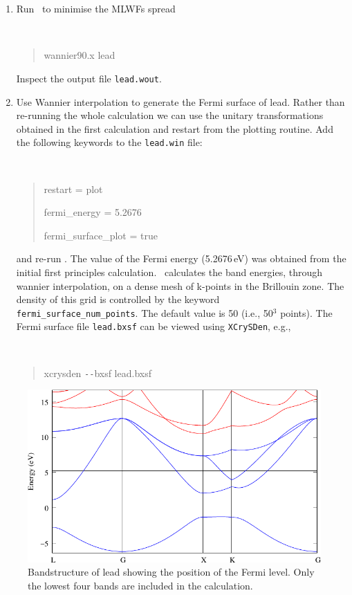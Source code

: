 \documentclass[a4paper,11pt,twoside]{article}
\begin{document}
\begin{enumerate}
\item Run \wannier\ to minimise the MLWFs spread
{\tt
\begin{quote}
wannier90.x lead
\end{quote} }
Inspect the output file {\tt lead.wout}.
\item Use Wannier interpolation to generate the Fermi surface of
  lead. Rather than re-running the whole calculation we can use the
  unitary transformations obtained in the first calculation and
  restart from the plotting routine. Add the following keywords to the
  {\tt lead.win} file: {\tt
\begin{quote}
restart = plot

fermi\_energy = 5.2676

fermi\_surface\_plot = true
\end{quote} } and re-run \wannier. The value of the Fermi energy
(5.2676\,eV) was obtained from the initial first principles
calculation. \wannier\ calculates the band energies, through wannier
interpolation, on a dense mesh of k-points in the Brillouin zone. The
density of this grid is controlled by the keyword {\tt
  fermi\_surface\_num\_points}. The default value is 50 (i.e., 50$^3$
points).  The Fermi surface file {\tt lead.bxsf} can be viewed using
{\tt XCrySDen}, e.g., 
%
{\tt
\begin{quote}
xcrysden \texttt{-{}-}bxsf lead.bxsf
\end{quote} }
\end{enumerate}

\begin{figure}[h]
\begin{center}
\includegraphics{lead}
\caption{Bandstructure of lead showing the position of the Fermi
  level. Only the lowest four bands are included in the calculation.} 
\label{fig:pb-bnd}
\end{center}
\end{figure}
\end{document}
